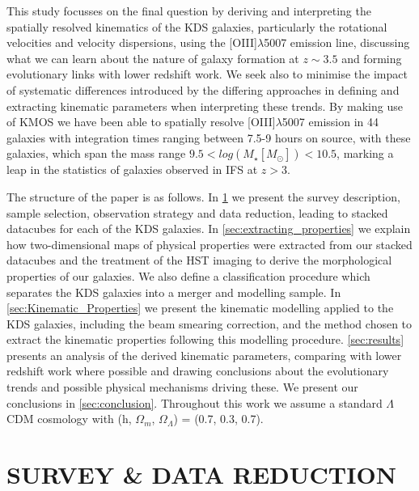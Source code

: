 \documentclass[fleqn,usenatbib]{mn2e}
\begin{document}
This study focusses on the final question by deriving and interpreting the spatially resolved kinematics of the KDS galaxies, particularly the rotational velocities and velocity dispersions, using the [OIII]$\lambda$5007 emission line, discussing what we can learn about the nature of galaxy formation at $z \sim 3.5$ and forming evolutionary links with lower redshift work.
We seek also to minimise the impact of systematic differences introduced by the differing approaches in defining and extracting kinematic parameters when interpreting these trends.  
By making use of KMOS we have been able to spatially resolve [OIII]$\lambda$5007 emission in 44 galaxies with integration times ranging between 7.5-9 hours on source, with these galaxies, which span the mass range $9.5 < log(M_{\star}[M_{\odot}]) < 10.5$, marking a leap in the statistics of galaxies observed in IFS at $z > 3$.

The structure of the paper is as follows. In \cref{sec:Survey_and_data} we present the survey description, sample selection, observation strategy and data reduction, leading to stacked datacubes for each of the KDS galaxies.
In \cref{sec:extracting_properties} we explain how two-dimensional maps of physical properties were extracted from our stacked datacubes and the treatment of the HST imaging to derive the morphological properties of our galaxies.
We also define a classification procedure which separates the KDS galaxies into a merger and modelling sample.
In \cref{sec:Kinematic_Properties} we present the kinematic modelling applied to the KDS galaxies, including the beam smearing correction, and the method chosen to extract the kinematic properties following this modelling procedure.
\cref{sec:results} presents an analysis of the derived kinematic parameters, comparing with lower redshift work where possible and drawing conclusions about the evolutionary trends and possible physical mechanisms driving these.
We present our conclusions in \cref{sec:conclusion}.
Throughout this work we assume a standard $\Lambda$CDM cosmology with (h, $\Omega_{m}$, $\Omega_{\Lambda}$) = (0.7, 0.3, 0.7). 

\section{SURVEY \& DATA REDUCTION}\label{sec:Survey_and_data}
\end{document}
